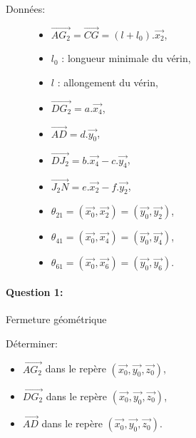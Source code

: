 Données:
\begin{figure}[!h]
 \begin{minipage}{0.45\linewidth}
\begin{itemize}
 \item $\overrightarrow{AG_2}=\overrightarrow{CG}=(l+l_0).\overrightarrow{x_2}$,
 \item $l_0$ : longueur minimale du vérin,
 \item $l$ : allongement du vérin,
 \item $\overrightarrow{DG_2}=a.\overrightarrow{x_4}$,
 \item $\overrightarrow{AD}=d.\overrightarrow{y_0}$,
\end{itemize}
 \end{minipage}
\hfill
 \begin{minipage}{0.45\linewidth}
\begin{itemize}
 \item $\overrightarrow{DJ_2}=b.\overrightarrow{x_4}-c.\overrightarrow{y_4}$,
 \item $\overrightarrow{J_2N}=e.\overrightarrow{x_2}-f.\overrightarrow{y_2}$,
 \item $\theta_{21}=(\overrightarrow{x_0},\overrightarrow{x_2})=(\overrightarrow{y_0},\overrightarrow{y_2})$,
 \item $\theta_{41}=(\overrightarrow{x_0},\overrightarrow{x_4})=(\overrightarrow{y_0},\overrightarrow{y_4})$,
 \item $\theta_{61}=(\overrightarrow{x_0},\overrightarrow{x_6})=(\overrightarrow{y_0},\overrightarrow{y_6})$.
\end{itemize}
 \end{minipage}
\end{figure}

\paragraph{Question 1:} Fermeture géométrique

Déterminer:
\begin{itemize}
 \item $\overrightarrow{AG_2}$ dans le repère $(\overrightarrow{x_0},\overrightarrow{y_0},\overrightarrow{z_0})$,
 \item $\overrightarrow{DG_2}$ dans le repère $(\overrightarrow{x_0},\overrightarrow{y_0},\overrightarrow{z_0})$,
 \item $\overrightarrow{AD}$ dans le repère $(\overrightarrow{x_0},\overrightarrow{y_0},\overrightarrow{z_0})$.
\end{itemize}

